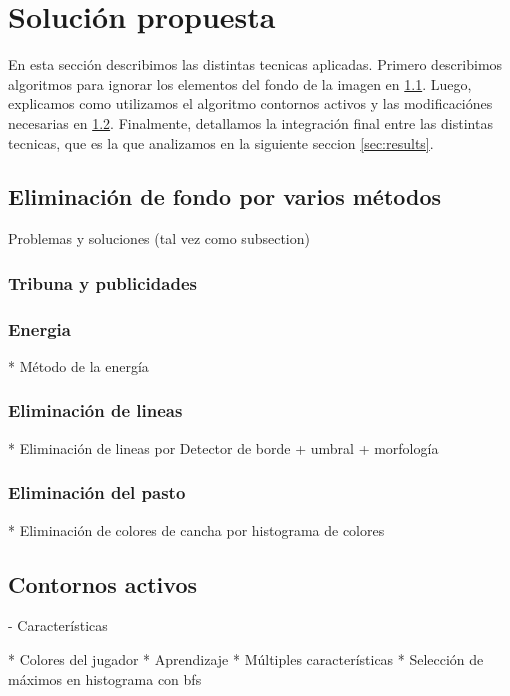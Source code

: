 \chapter{Solución propuesta}
\label{sec:solution}

En esta sección describimos las distintas tecnicas aplicadas. Primero describimos algoritmos para
ignorar los elementos del fondo de la imagen en \ref{sec:background-elimination}. Luego, explicamos
como utilizamos el algoritmo contornos activos\cite{fast-level-set} y las modificaciónes necesarias
en \ref{sec:ac}. Finalmente, detallamos la integración final entre las distintas tecnicas, que es
la que analizamos en la siguiente seccion \ref{sec:results}.

\section{Eliminación de fondo por varios métodos}
\label{sec:background-elimination}
Problemas y soluciones (tal vez como subsection)

\subsection{Tribuna y publicidades}

\subsection{Energia}
  * Método de la energía

\subsection{Eliminación de lineas}
  * Eliminación de lineas por Detector de borde + umbral + morfología

\subsection{Eliminación del pasto}
  * Eliminación de colores de cancha por histograma de colores


\section{Contornos activos}
\label{sec:ac}

- Características

  * Colores del jugador
  * Aprendizaje
  * Múltiples características
  * Selección de máximos en histograma con bfs

